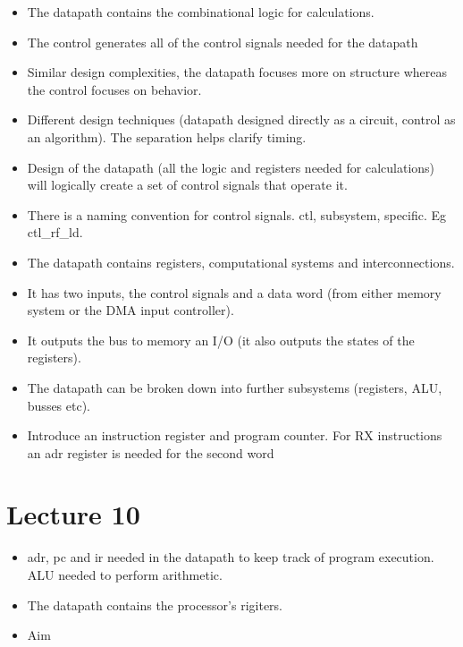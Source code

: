 \documentclass{article}
\begin{document}
\begin{itemize}
\item The datapath contains the combinational logic for calculations.
\item The control generates all of the control signals needed for the datapath
\item Similar design complexities, the datapath focuses more on structure whereas the control focuses on behavior.
\item Different design techniques (datapath designed directly as a circuit, control as an algorithm). The separation helps clarify timing.
\item Design of the datapath (all the logic and registers needed for calculations) will logically create a set of control signals that operate it.
\item There is a naming convention for control signals. ctl, subsystem, specific. Eg ctl\_rf\_ld.
\item The datapath contains registers, computational systems and interconnections.
\item It has two inputs, the control signals and a data word (from either memory system or the DMA input controller).
\item It outputs the bus to memory an I/O (it also outputs the states of the registers).
\item The datapath can be broken down into further subsystems (registers, ALU, busses etc).
\item Introduce an instruction register and program counter. For RX instructions an adr register is needed for the second word
\end{itemize}


\section*{Lecture 10}
\begin{itemize}
\item adr, pc and ir needed in the datapath to keep track of program execution. ALU needed to perform arithmetic.
\item The datapath contains the processor's rigiters. 
\item Aim 
\end{itemize}
\end{document}
